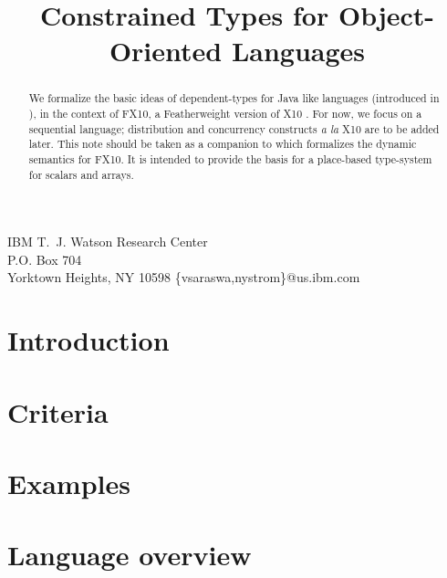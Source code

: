 \documentclass[nocopyrightspace,preprint,10pt]{sigplanconf}
\newcommand\Xten{{\sf X10}}
\newcommand\FXten{{\sf FX10}}
\begin{document}
\title{Constrained Types for Object-Oriented Languages}
   {IBM T.~J. Watson Research Center \\
    P.O. Box 704 \\
    Yorktown Heights, NY 10598}
   {\{vsaraswa,nystrom\}@us.ibm.com}

\maketitle


\begin{abstract}
We formalize the basic ideas of dependent-types for Java like
languages (introduced in \cite{DependentTypes}), in the context of
\FXten, a Featherweight version of \Xten{} \cite{X10}.  For now, we
focus on a sequential language; distribution and concurrency
constructs {\em a la} \Xten{} are to be added later. This note should
be taken as a companion to \cite{X10-concur} which formalizes the
dynamic semantics for \FXten. It is intended to provide the basis for
a place-based type-system for scalars and arrays.
\end{abstract}

\section{Introduction}


\section{Criteria}


\section{Examples}

\section{Language overview}
\end{document}
